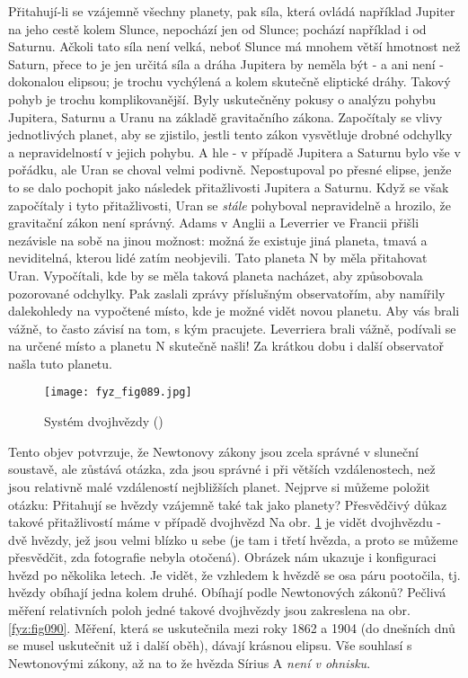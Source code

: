     Při\-ta\-hují-li se vzájemně všechny planety, pak síla, která ovládá například Jupiter na jeho 
    cestě kolem Slunce, nepochází jen od Slunce; pochází například i od Saturnu. Ačkoli tato síla 
    není velká, neboť Slunce má mnohem větší hmotnost než Saturn, přece to je jen určitá síla a 
    dráha Jupitera by neměla být - a ani není - dokonalou elipsou; je trochu vychýlená a 
     kolem skutečně eliptické dráhy. Takový pohyb je trochu komplikovanější. Byly 
    uskutečněny pokusy o analýzu pohybu Jupitera, Saturnu a Uranu na základě gravitačního zákona. 
    Započítaly se vlivy jednotlivých planet, aby se zjistilo, jestli tento zákon vysvětluje drobné 
    odchylky a nepravidelností v jejich pohybu. A hle - v případě Jupitera a Saturnu bylo vše v 
    pořádku, ale Uran se choval velmi podivně. Nepostupoval po přesné elipse, jenže to se dalo 
    pochopit jako následek přitažlivosti Jupitera a Saturnu. Když se však započítaly i tyto 
    přitažlivosti, Uran se \emph{stále} pohyboval nepravidelně a hrozilo, že gravitační zákon není 
    správný. Adams v Anglii a Leverrier ve Francii přišli nezávisle na sobě na jinou možnost: možná 
    že existuje jiná planeta, tmavá a neviditelná, kterou lidé zatím neobjevili. Tato planeta N by 
    měla přitahovat Uran. Vypočítali, kde by se měla taková planeta nacházet, aby způsobovala 
    pozorované odchylky. Pak zaslali zprávy příslušným observatořím, aby namířily dalekohledy na 
    vypočtené místo, kde je možné vidět novou planetu. Aby vás brali vážně, to často závisí na tom, 
    s kým pracujete. Leverriera brali vážně, podívali se na určené místo a planetu N skutečně 
    našli! Za krátkou dobu i další observatoř našla tuto planetu.

    \begin{figure}[ht!]  %
      \centering
      \texttt{[image: fyz\_fig089.jpg]}
      \caption{Systém dvojhvězdy (\cite[s.~99]{Feynman01})}
      \label{fyz:fig089}
    \end{figure}
    
    Tento objev potvrzuje, že Newtonovy zákony jsou zcela správné v sluneční soustavě, ale zůstává 
    otázka, zda jsou správné i při větších vzdálenostech, než jsou relativně malé vzdáleností 
    nejbližších planet. Nejprve si můžeme položit otázku: Přitahují se hvězdy vzájemně také tak 
    jako planety? Přesvědčivý důkaz takové přitažlivostí máme v případě dvojhvězd Na obr. 
    \ref{fyz:fig089} je vidět dvojhvězdu - dvě hvězdy, jež jsou velmi blízko u sebe (je tam i třetí 
    hvězda, a proto se můžeme přesvědčit, zda fotografie nebyla otočená). Obrázek nám ukazuje i 
    konfiguraci hvězd po několika letech. Je vidět, že vzhledem k  hvězdě se osa páru 
    pootočila, tj. hvězdy obíhají jedna kolem druhé. Obíhají podle Newtonových zákonů? Pečlivá 
    měření relativních poloh jedné takové dvojhvězdy jsou zakreslena na obr. \ref{fyz:fig090}. 
    Měření, která se uskutečnila mezi roky \num{1862} a \num{1904} (do dnešních dnů se musel 
    uskutečnit už i další oběh), dávají krásnou elipsu. Vše souhlasí s Newtonovými zákony, až na to 
    že hvězda Sírius A \emph{není v ohnisku}.  

